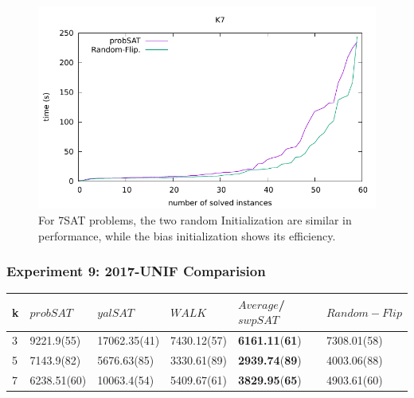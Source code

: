 \documentclass[12pt,a4paper,twoside]{scrartcl}
\numberwithin{equation}{section}
\begin{document}
  \begin{figure}[H]
\begin{center}
  \includegraphics[scale = 1]{DATA/K7/e4r.pdf}
  \end{center}
  \caption{For 7SAT problems, the two random Initialization are similar in performance, while the bias initialization shows its efficiency.}
  \label{Experiment 8 k7 cactus plot}
  \end{figure} 
\subsubsection{Experiment 9: 2017-UNIF Comparision} 
\label{sec:Experiment 9}
   \begin{table}[H]
\begin{center}
    \begin{tabular}{|l|l|l|l|l|p{3cm}|}
\hline 

    k &$probSAT$&$yalSAT$&$WALK$&$Average$/$swpSAT$&$Random-Flip$ \\ \hline      
    3 &9221.9(55)&17062.35(41)&7430.12(57)&\textbf{6161.11}(\textbf{61})&7308.01(58)\\ \hline
    5& 7143.9(82)&5676.63(85)&3330.61(89)&\textbf{2939.74}(\textbf{89})&4003.06(88)\\ \hline
    7& 6238.51(60)&10063.4(54)&5409.67(61)&\textbf{3829.95}(\textbf{65})&4903.61(60)\\ \hline
	
\end{tabular}
\end{center}
\end{table}
\end{document}
